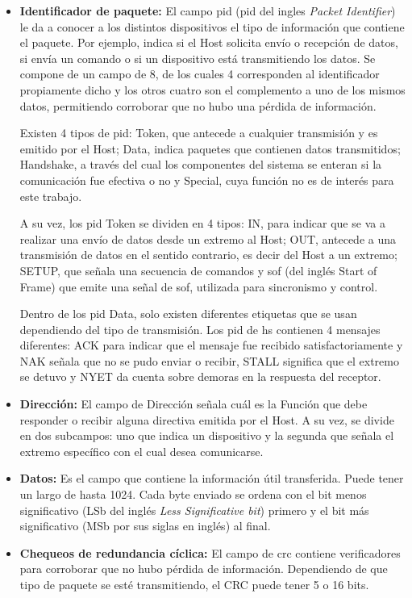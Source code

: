 	\begin{itemize}

	\item {\bf Identificador de paquete:}
		El campo \acrlong{pid} (\acrshort{pid} del ingles {\it Packet Identifier}) le da a conocer a los distintos dispositivos el tipo de información que contiene el paquete. Por ejemplo, indica si el Host solicita envío o recepción de datos, si envía un comando o si un dispositivo está transmitiendo los datos. Se compone de un campo de \SI{8}{\bit}, de los cuales 4 corresponden al identificador propiamente dicho y los otros cuatro son el complemento a uno de los mismos datos, permitiendo corroborar que no hubo una pérdida de información.%
		
		Existen 4 tipos de \acrshort{pid}: Token, que antecede a cualquier transmisión y es emitido por el Host; Data, indica paquetes que contienen datos transmitidos; Handshake, a través del cual los componentes del sistema se enteran si la comunicación fue efectiva o no y Special, cuya función no es de interés para este trabajo.%
	
		A su vez, los \acrshort{pid} Token se dividen en 4 tipos: IN, para indicar que se va a realizar una envío de datos desde un extremo al Host; OUT, antecede a una transmisión de datos en el sentido contrario, es decir del Host a un extremo; SETUP, que señala una secuencia de comandos y \acrshort{sof} (del inglés {Start of Frame)} que emite una señal de \acrlong{sof}, utilizada para sincronismo y control.%
	
		Dentro de los \acrshort{pid} Data, solo existen diferentes etiquetas que se usan dependiendo del tipo de transmisión. Los \acrshort{pid} de \acrfull{hs} contienen 4 mensajes diferentes: ACK para indicar que el mensaje fue recibido satisfactoriamente y NAK señala que no se pudo enviar o recibir, STALL significa que el extremo se detuvo y NYET da cuenta sobre demoras en la respuesta del receptor.
	
	\item{\bf Dirección:}
		El campo de Dirección señala cuál es la Función que debe responder o recibir alguna directiva emitida por el Host. A su vez, se divide en dos subcampos: uno que indica un dispositivo y la segunda que señala el extremo específico con el cual desea comunicarse.

	\item{\bf Datos:}
		Es el campo que contiene la información útil transferida. Puede tener un largo de hasta \SI{1024}{\byte}. Cada byte enviado se ordena con el bit menos significativo (LSb del inglés {\it Less Significative bit}) primero y el bit más significativo (MSb por sus siglas en inglés) al final.

	\item{\bf Chequeos de redundancia cíclica:}
		El campo de \acrfull{crc} contiene verificadores para corroborar que no hubo pérdida de información. Dependiendo de que tipo de paquete se esté transmitiendo, el CRC puede tener 5 o 16 bits. 
	\end{itemize}

